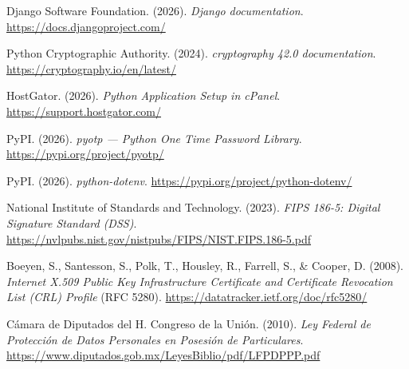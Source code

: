 \documentclass[10pt,letterpaper]{report}
\begin{document}
\begin{description}[leftmargin=0pt,labelwidth=0pt,labelsep=0pt,itemsep=8pt]

    \item Django Software Foundation. (2026). \textit{Django documentation}. \url{https://docs.djangoproject.com/}

    \item Python Cryptographic Authority. (2024). \textit{cryptography 42.0 documentation}. \url{https://cryptography.io/en/latest/}

    \item HostGator. (2026). \textit{Python Application Setup in cPanel}. \url{https://support.hostgator.com/}

    \item PyPI. (2026). \textit{pyotp --- Python One Time Password Library}. \url{https://pypi.org/project/pyotp/}

    \item PyPI. (2026). \textit{python-dotenv}. \url{https://pypi.org/project/python-dotenv/}

    \item National Institute of Standards and Technology. (2023). \textit{FIPS 186-5: Digital Signature Standard (DSS)}. \url{https://nvlpubs.nist.gov/nistpubs/FIPS/NIST.FIPS.186-5.pdf}

    \item Boeyen, S., Santesson, S., Polk, T., Housley, R., Farrell, S., \& Cooper, D. (2008). \textit{Internet X.509 Public Key Infrastructure Certificate and Certificate Revocation List (CRL) Profile} (RFC 5280). \url{https://datatracker.ietf.org/doc/rfc5280/}

    \item Cámara de Diputados del H. Congreso de la Unión. (2010). \textit{Ley Federal de Protección de Datos Personales en Posesión de Particulares}. \url{https://www.diputados.gob.mx/LeyesBiblio/pdf/LFPDPPP.pdf}

\end{description}
\endgroup
\end{document}
